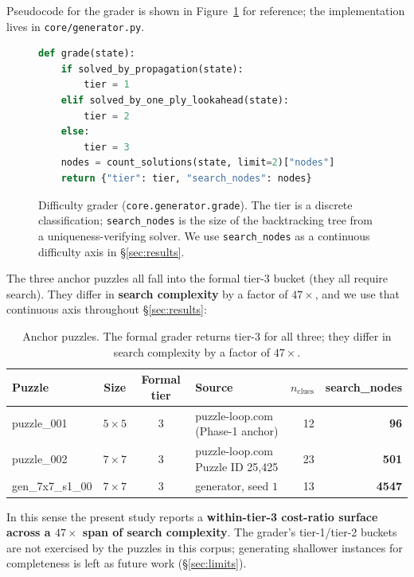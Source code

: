 \documentclass[11pt,letterpaper]{article}
\begin{document}
Pseudocode for the grader is shown in Figure~\ref{fig:grader} for
reference; the implementation lives in
\texttt{core/generator.py}.

\begin{figure}[h]
\begin{lstlisting}[language=Python]
def grade(state):
    if solved_by_propagation(state):
        tier = 1
    elif solved_by_one_ply_lookahead(state):
        tier = 2
    else:
        tier = 3
    nodes = count_solutions(state, limit=2)["nodes"]
    return {"tier": tier, "search_nodes": nodes}
\end{lstlisting}
\caption{Difficulty grader (\texttt{core.generator.grade}). The
tier is a discrete classification; \texttt{search\_nodes} is the
size of the backtracking tree from a uniqueness-verifying solver.
We use \texttt{search\_nodes} as a continuous difficulty axis in
\S\ref{sec:results}.}
\label{fig:grader}
\end{figure}

The three anchor puzzles all fall into the formal tier-3 bucket
(they all require search). They differ in \textbf{search
complexity} by a factor of $47\times$, and we use that continuous
axis throughout \S\ref{sec:results}:

\begin{table}[h]
\centering\small
\begin{tabular}{@{}l c c l r r@{}}
\toprule
Puzzle & Size & Formal tier & Source & $n_{\text{clues}}$ &
  search\_nodes \\
\midrule
puzzle\_001     & $5{\times}5$ & 3
  & puzzle-loop.com (Phase-1 anchor) & 12 & \textbf{96} \\
puzzle\_002     & $7{\times}7$ & 3
  & puzzle-loop.com Puzzle ID 25,425 & 23 & \textbf{501} \\
gen\_7x7\_s1\_00 & $7{\times}7$ & 3
  & generator, seed $1$                 & 13 & \textbf{4547} \\
\bottomrule
\end{tabular}
\caption{Anchor puzzles. The formal grader returns tier-3 for all
three; they differ in search complexity by a factor of $47\times$.}
\label{tab:anchors}
\end{table}

In this sense the present study reports a \textbf{within-tier-3
cost-ratio surface across a $47\times$ span of search complexity}.
The grader's tier-1/tier-2 buckets are not exercised by the puzzles
in this corpus; generating shallower instances for completeness is
left as future work (\S\ref{sec:limits}).
\end{document}
